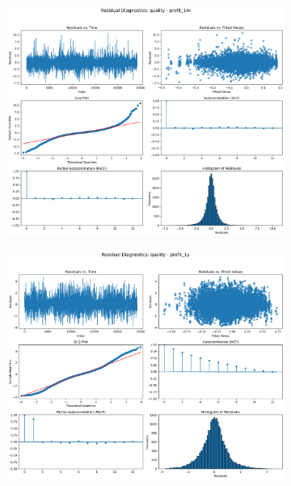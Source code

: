 \documentclass[11pt,english,a4paper,hidelinks]{book}
\begin{document}
\begin{figure}[H]
    \centering
    \begin{subfigure}[b]{0.32\textwidth}
        \centering
        \includegraphics[width=\textwidth]{images/code/models/linear_regression/first_model/EU/quality_profit_1m_residuals - Gaussian.png}
    \end{subfigure}
    \hfill
    \begin{subfigure}[b]{0.32\textwidth}
        \centering
        \includegraphics[width=\textwidth]{images/code/models/linear_regression/first_model/EU/quality_profit_1y_residuals - Gaussian.png}

\end{subfigure}
\end{figure}
\end{document}
